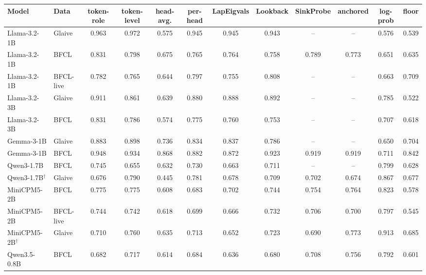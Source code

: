 \begin{tabular}{llcccccccccc}
\toprule
Model & Data & token-role & token-level & head-avg. & per-head & LapEigvals & Lookback & SinkProbe & anchored & log-prob & floor \\
\midrule
Llama-3.2-1B & Glaive & 0.963 & 0.972 & 0.575 & 0.945 & 0.945 & 0.943 & -- & -- & 0.576 & 0.539 \\
Llama-3.2-1B & BFCL & 0.831 & 0.798 & 0.675 & 0.765 & 0.764 & 0.758 & 0.789 & 0.773 & 0.651 & 0.635 \\
Llama-3.2-1B & BFCL-live & 0.782 & 0.765 & 0.644 & 0.797 & 0.755 & 0.808 & -- & -- & 0.663 & 0.709 \\
Llama-3.2-3B & Glaive & 0.911 & 0.861 & 0.639 & 0.880 & 0.888 & 0.892 & -- & -- & 0.785 & 0.522 \\
Llama-3.2-3B & BFCL & 0.831 & 0.786 & 0.574 & 0.775 & 0.760 & 0.753 & -- & -- & 0.707 & 0.618 \\
Gemma-3-1B & Glaive & 0.883 & 0.898 & 0.736 & 0.834 & 0.837 & 0.786 & -- & -- & 0.650 & 0.704 \\
Gemma-3-1B & BFCL & 0.948 & 0.934 & 0.868 & 0.882 & 0.872 & 0.923 & 0.919 & 0.919 & 0.711 & 0.842 \\
Qwen3-1.7B & BFCL & 0.745 & 0.655 & 0.632 & 0.730 & 0.663 & 0.711 & -- & -- & 0.799 & 0.628 \\
Qwen3-1.7B$^\dagger$ & Glaive & 0.676 & 0.790 & 0.445 & 0.781 & 0.678 & 0.709 & 0.702 & 0.674 & 0.867 & 0.677 \\
MiniCPM5-2B & BFCL & 0.775 & 0.775 & 0.608 & 0.683 & 0.702 & 0.744 & 0.754 & 0.764 & 0.823 & 0.578 \\
MiniCPM5-2B & BFCL-live & 0.744 & 0.742 & 0.618 & 0.699 & 0.666 & 0.732 & 0.706 & 0.700 & 0.797 & 0.545 \\
MiniCPM5-2B$^\dagger$ & Glaive & 0.710 & 0.760 & 0.635 & 0.713 & 0.652 & 0.723 & 0.690 & 0.773 & 0.913 & 0.685 \\
Qwen3.5-0.8B & BFCL & 0.682 & 0.717 & 0.614 & 0.684 & 0.636 & 0.680 & 0.708 & 0.756 & 0.792 & 0.601 \\
\bottomrule
\end{tabular}
